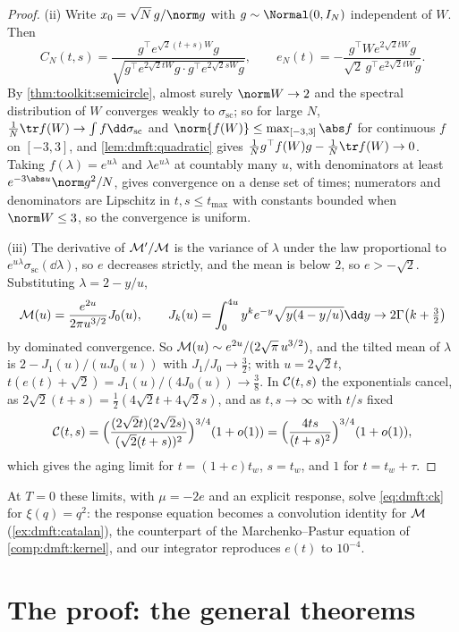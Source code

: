 \begin{refsection}
\begin{proof}
(ii) Write $x_0=\sqrt N\,g/\norm g$ with $g\sim\Normal(0,I_N)$ independent of $W$. Then
\[
C_N(t,s)=\frac{g^\top e^{\sqrt2(t+s)W}g}{\sqrt{g^\top e^{2\sqrt2tW}g\cdot g^\top e^{2\sqrt2sW}g}},\qquad e_N(t)=-\frac{g^\top We^{2\sqrt2tW}g}{\sqrt2\,g^\top e^{2\sqrt2tW}g}.
\]
By \cref{thm:toolkit:semicircle}, almost surely $\norm W\to2$ and the spectral distribution of $W$ converges weakly to $\sigma_{\mathrm{sc}}$; so for large $N$, $\frac1N\tr f(W)\to\int f\dd\sigma_{\mathrm{sc}}$ and $\norm{f(W)}\le\max_{[-3,3]}\abs f$ for continuous $f$ on $[-3,3]$, and \cref{lem:dmft:quadratic} gives $\frac1Ng^\top f(W)g-\frac1N\tr f(W)\to0$. Taking $f(\lambda)=e^{u\lambda}$ and $\lambda e^{u\lambda}$ at countably many $u$, with denominators at least $e^{-3\abs u}\norm g^2/N$, gives convergence on a dense set of times; numerators and denominators are Lipschitz in $t,s\le t_{\max}$ with constants bounded when $\norm W\le3$, so the convergence is uniform.

(iii) The derivative of $\mathcal{M}'/\mathcal{M}$ is the variance of $\lambda$ under the law proportional to $e^{u\lambda}\sigma_{\mathrm{sc}}(\dd\lambda)$, so $e$ decreases strictly, and the mean is below $2$, so $e>-\sqrt2$. Substituting $\lambda=2-y/u$,
\[
\dmftM(u)=\frac{e^{2u}}{2\pi u^{3/2}}J_0(u),\qquad J_k(u)=\int_0^{4u}y^ke^{-y}\sqrt{y(4-y/u)}\dd y\to2\Gamma\bigl(k+\tfrac32\bigr)
\]
by dominated convergence. So $\mathcal{M}(u)\sim e^{2u}/(2\sqrt\pi\,u^{3/2})$, and the tilted mean of $\lambda$ is $2-J_1(u)/(uJ_0(u))$ with $J_1/J_0\to\frac32$; with $u=2\sqrt2t$, $t(e(t)+\sqrt2)=J_1(u)/(4J_0(u))\to\frac38$. In $\mathcal{C}(t,s)$ the exponentials cancel, as $2\sqrt2(t+s)=\frac12(4\sqrt2t+4\sqrt2s)$, and as $t,s\to\infty$ with $t/s$ fixed
\[
\mathcal{C}(t,s)=\Bigl(\frac{(2\sqrt2t)(2\sqrt2s)}{(\sqrt2(t+s))^2}\Bigr)^{3/4}(1+o(1))=\Bigl(\frac{4ts}{(t+s)^2}\Bigr)^{3/4}(1+o(1)),
\]
which gives the aging limit for $t=(1+c)t_w$, $s=t_w$, and $1$ for $t=t_w+\tau$.
\end{proof}

At $T=0$ these limits, with $\mu=-2e$ and an explicit response, solve \eqref{eq:dmft:ck} for $\xi(q)=q^2$: the response equation becomes a convolution identity for $\mathcal{M}$ (\cref{ex:dmft:catalan}), the counterpart of the Marchenko--Pastur equation of \cref{comp:dmft:kernel}, and our integrator reproduces $e(t)$ to $10^{-4}$.

\section{The proof: the general theorems}\label{sec:dmft:general}


\end{refsection}

